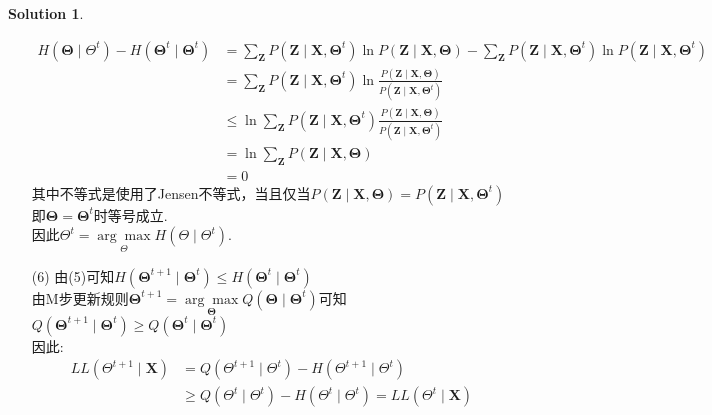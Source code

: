 \documentclass[a4paper,UTF8]{article}
\numberwithin{equation}{section}
\theoremstyle{definition}
\newtheorem*{solution}{Solution}
\begin{document}
\begin{solution}
\begin{enumerate}
\begin{equation}
            \begin{aligned} H\left(\boldsymbol{\Theta} \mid \Theta^{t}\right)-H\left(\boldsymbol{\Theta}^{t} \mid \boldsymbol{\Theta}^{t}\right) & =\sum_{\boldsymbol{Z}} P\left(\boldsymbol{Z} \mid \boldsymbol{X}, \boldsymbol{\Theta}^{t}\right) \ln P(\boldsymbol{Z} \mid \boldsymbol{X}, \boldsymbol{\Theta})-\sum_{\boldsymbol{Z}} P\left(\boldsymbol{Z} \mid \boldsymbol{X}, \boldsymbol{\Theta}^{t}\right) \ln P\left(\boldsymbol{Z} \mid \boldsymbol{X}, \boldsymbol{\Theta}^{t}\right) \\ & =\sum_{\boldsymbol{Z}} P\left(\boldsymbol{Z} \mid \boldsymbol{X}, \boldsymbol{\Theta}^{t}\right) \ln \frac{P(\boldsymbol{Z} \mid \boldsymbol{X}, \boldsymbol{\Theta})}{P\left(\boldsymbol{Z} \mid \boldsymbol{X}, \boldsymbol{\Theta}^{t}\right)} \\ & \leq \ln \sum_{\boldsymbol{Z}} P\left(\boldsymbol{Z} \mid \boldsymbol{X}, \boldsymbol{\Theta}^{t}\right) \frac{P(\boldsymbol{Z} \mid \boldsymbol{X}, \boldsymbol{\Theta})}{P\left(\boldsymbol{Z} \mid \boldsymbol{X}, \boldsymbol{\Theta}^{t}\right)} \\ & =\ln \sum_{\boldsymbol{Z}} P(\boldsymbol{Z} \mid \boldsymbol{X}, \boldsymbol{\Theta}) \\ & =0\end{aligned} \nonumber
        \end{equation}
        其中不等式是使用了Jensen不等式，当且仅当$P(\boldsymbol{Z} \mid \boldsymbol{X}, \boldsymbol{\Theta})=P\left(\boldsymbol{Z} \mid \boldsymbol{X}, \boldsymbol{\Theta}^{t}\right)$即$\boldsymbol{\Theta}=\boldsymbol{\Theta}^{t}$时等号成立. \\
        因此$\Theta^{t}=\underset{\Theta}{\arg \max } H\left(\Theta \mid \Theta^{t}\right)$.
        \item [(6)]
        由(5)可知$H\left(\boldsymbol{\Theta}^{t+1} \mid \boldsymbol{\Theta}^{t}\right) \leq H\left(\boldsymbol{\Theta}^{t} \mid \boldsymbol{\Theta}^{t}\right)$ \\
        由M步更新规则$\boldsymbol{\Theta}^{t+1}=\underset{\boldsymbol{\Theta}}{\arg \max } Q\left(\boldsymbol{\Theta} \mid \mathbf{\Theta}^{t}\right)$可知$Q\left(\boldsymbol{\Theta}^{t+1} \mid \boldsymbol{\Theta}^{t}\right) \geq Q\left(\boldsymbol{\Theta}^{t} \mid \boldsymbol{\Theta}^{t}\right)$  \\
        因此:
        \begin{align*} L L\left(\Theta^{t+1} \mid \boldsymbol{X}\right) & =Q\left(\Theta^{t+1} \mid \Theta^{t}\right)-H\left(\Theta^{t+1} \mid \Theta^{t}\right) \\ & \geq Q\left(\Theta^{t} \mid \Theta^{t}\right)-H\left(\Theta^{t} \mid \Theta^{t}\right) =L L\left(\Theta^{t} \mid \boldsymbol{X}\right)\end{align*}
    \end{enumerate}
\end{solution}
\end{document}
